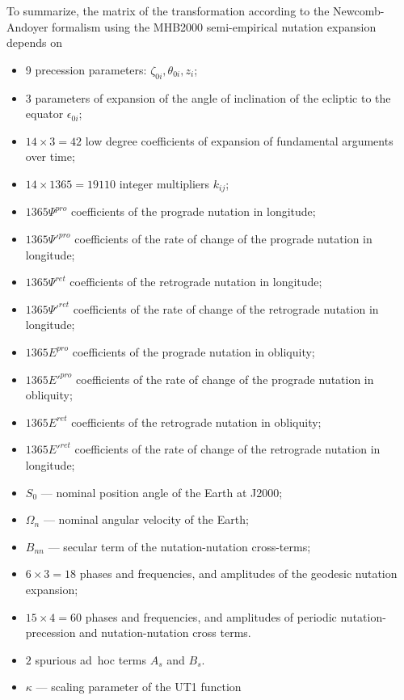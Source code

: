   To summarize, the matrix of the transformation according to the
Newcomb-Andoyer formalism using the MHB2000 semi-empirical nutation
expansion depends on
%
\begin{itemize}
   \item 9 precession parameters: $ \zeta_{0i}, \theta_{0i}, z_i$;
   \item 3 parameters of expansion of the angle of inclination of the ecliptic
         to the equator $\epsilon_{0i}$;
   \item $ 14\times 3 = 42 $ low degree coefficients of expansion of fundamental
           arguments over time;
   \item $ 14\times 1365 = 19110 $ integer multipliers $k_{ij}$;
   \item $ 1365 \Psi^{pro}  $ coefficients of the prograde nutation in
                               longitude;
   \item $ 1365 \Psi'^{pro} $ coefficients of the rate of change of the
                               prograde nutation in longitude;
   \item $ 1365 \Psi^{ret}  $ coefficients of the retrograde nutation
                               in longitude;
   \item $ 1365 \Psi'^{ret} $ coefficients of the rate of change of
                               the retrograde nutation in longitude;
   \item $ 1365 E^{pro}  $ coefficients of the prograde nutation in obliquity;
   \item $ 1365 E'^{pro} $ coefficients of the rate of change of the prograde
                            nutation in obliquity;
   \item $ 1365 E^{ret}  $ coefficients of the retrograde nutation in
                            obliquity;
   \item $ 1365 E'^{ret} $ coefficients of the rate of change of the
                            retrograde nutation in longitude;
   \item $ S_0 $ --- nominal position angle of the Earth at J2000;
   \item $ \Omega_n $ --- nominal angular velocity of the Earth;
   \item $ B_{nn} $ --- secular term of the nutation-nutation cross-terms;
   \item $ 6\times 3 = 18 $ phases and frequencies, and amplitudes of the
                            geodesic nutation expansion;
   \item $ 15\times 4 = 60 $ phases and frequencies, and amplitudes of periodic
                             nutation-precession and nutation-nutation cross
                             terms.
   \item $ 2 $ spurious ad~hoc terms $A_s$ and $B_s$.
   \item $ \kappa $ --- scaling parameter of the UT1 function
\end{itemize}

